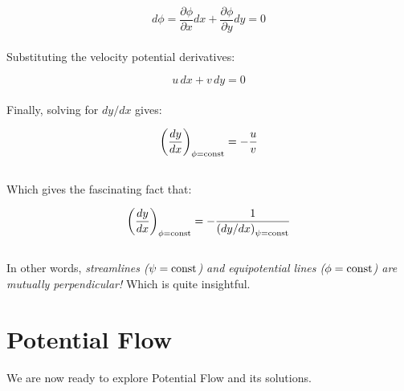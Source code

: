 \documentclass[11pt]{article}
\begin{document}
\begin{equation*}
    d\phi = \frac{\partial \phi}{\partial x}dx + \frac{\partial \phi}{\partial y}dy = 0
\end{equation*} \\ 
\noindent
Substituting the velocity potential derivatives:

\begin{equation*}
    u\,dx + v\,dy = 0
\end{equation*}\\
\noindent
Finally, solving for $dy/dx$ gives:

\begin{equation*}
    \left( \frac{dy}{dx} \right)_{\phi = \textnormal{const}}=-\frac{u}{v}
\end{equation*}\\
Which gives the fascinating fact that:

\begin{equation*}
    \left( \frac{dy}{dx} \right)_{\phi = \textnormal{const}} = -\frac{1}{\left( dy/dx \right)_{\psi=\textnormal{const}}}
\end{equation*}\\
\noindent
In other words, \emph{streamlines ($\psi = \textnormal{const}$) and equipotential lines ($\phi = \textnormal{const}$) are mutually perpendicular!} Which is quite insightful.

\section{Potential Flow}
We are now ready to explore Potential Flow and its solutions.
\end{document}
